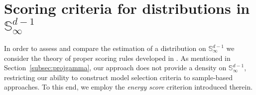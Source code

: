 \section{Scoring criteria for distributions in ${\mathbb S}_\infty^{d-1}$\label{sec:evaluation}}

In order to assess and compare the estimation of a distribution on ${\mathbb S}_\infty^{d-1}$ we consider 
    the theory of proper scoring rules developed in \cite{gneiting2007}. As mentioned in 
    Section~\ref{subsec:projgamma}, our approach does not provide a density on 
    ${\mathbb S}_{\infty}^{d-1}$, restricting our ability to construct model selection criteria 
    to sample-based approaches.  To this end, we employ the \emph{energy score} criterion introduced
    therein.


